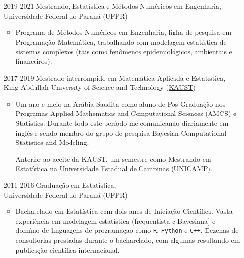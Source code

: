 \documentclass[12pt]{article}
\begin{document}
\begin{itemize}
 \item[2019-2021] Mestrando, Estat\'{i}stica e M\'{e}todos Num\'{e}ricos
                  em Engenharia,\\
                  Universidade Federal do Paran\'{a} (UFPR)
  \begin{itemize}
   \item Programa de M\'{e}todos Num\'{e}ricos em Engenharia, linha de
         pesquisa em Programa\c{c}\~{a}o Matem\'{a}tica, trabalhando com
         modelagem estat\'{i}stica de sistemas complexos (tais como
         fen\^{o}menos epidemiol\'{o}gicos, ambientais e financeiros).
  \end{itemize}

 \item[2017-2019] Mestrado interrompido em Matem\'{a}tica Aplicada e
                  Estat\'{i}stica,\\
                  King Abdullah University of Science and Technology
                  (\href{https://kaust.edu.sa/en}{\color{blue}KAUST})
  \begin{itemize}
   \item Um ano e meio na Ar\'{a}bia Saudita como aluno de
         P\'{o}s-Gradua\c{c}\~{a}o nos Programas Applied Mathematics and
         Computational Sciences (AMCS) e Statistics. Durante todo este
         per\'{i}odo me comunicando diariamente em ingl\^{e}s e sendo
         membro do grupo de pesquisa Bayesian Computational Statistics
         and Modeling.

         Anterior ao aceite da KAUST, um semestre como Mestrando em
         Estat\'{i}stica na Universidade Estadual de Campinas (UNICAMP).
  \end{itemize}

 \item[2011-2016] Gradua\c{c}\~{a}o em Estat\'{i}stica,\\
                  Universidade Federal do Paran\'{a}
                  (UFPR)
  \begin{itemize}
   \item Bacharelado em Estat\'{i}stica com dois anos de
         Inicia\c{c}\~{a}o Cient\'{i}fica. Vasta experi\^{e}ncia em
         modelagem estat\'{i}stica (frequentista e Bayesiana) e
         dom\'{i}nio de linguagens de programa\c{c}\~{a}o como
         \texttt{R}, \texttt{Python} e \texttt{C++}. Dezenas de
         consultorias prestadas durante o bacharelado, com algumas
         resultando em publica\c{c}\~{a}o cient\'{i}fica internacional.
  \end{itemize}
\end{itemize}
\end{document}

